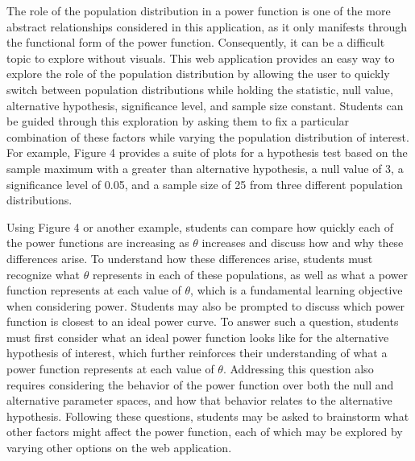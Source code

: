 \documentclass{TISE}
\begin{document}
The role of the population distribution in a power function is one of the more abstract relationships considered in this application, as it only manifests through the functional form of the power function. Consequently, it can be a difficult topic to explore without visuals. This web application provides an easy way to explore the role of the population distribution by allowing the user to quickly switch between population distributions while holding the statistic, null value, alternative hypothesis, significance level, and sample size constant. Students can be guided through this exploration by asking them to fix a particular combination of these factors while varying the population distribution of interest. For example, Figure 4 provides a suite of plots for a hypothesis test based on the sample maximum with a greater than alternative hypothesis, a null value of 3, a significance level of 0.05, and a sample size of 25 from three different population distributions.

Using Figure 4 or another example, students can compare how quickly each of the power functions are increasing as $\theta$ increases and discuss how and why these differences arise. To understand how these differences arise, students must recognize what $\theta$ represents in each of these populations, as well as what a power function represents at each value of $\theta$, which is a fundamental learning objective when considering power. Students may also be prompted to discuss which power function is closest to an ideal power curve. To answer such a question, students must first consider what an ideal power function looks like for the alternative hypothesis of interest, which further reinforces their understanding of what a power function represents at each value of $\theta$. Addressing this question also requires considering the behavior of the power function over both the null and alternative parameter spaces, and how that behavior relates to the alternative hypothesis. Following these questions, students may be asked to brainstorm what other factors might affect the power function, each of which may be explored by varying other options on the web application.

\newpage
\end{document}
